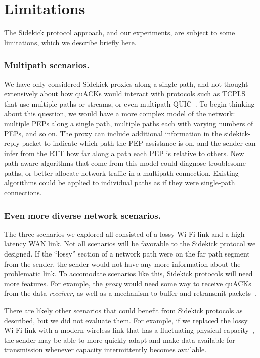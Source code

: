 \section{Limitations}
\label{sec:sidekick:limitations}

The Sidekick protocol approach, and our experiments, are subject to some
limitations, which we describe briefly here.

\subsubsection{Multipath scenarios.}
We have only considered Sidekick proxies along a single path, and not thought
extensively about how quACKs would interact with protocols such as
\mbox{TCPLS}~\cite{rochet2020tcpls} that use multiple paths or streams,
or even multipath QUIC~\cite{de2017multipath}.
To begin thinking about this question, we would have a more complex model of the
network: multiple PEPs along a single path, multiple paths each with varying
numbers of PEPs, and so on. The proxy can include additional information in the
sidekick-reply packet to indicate which path the PEP assistance is on, and the
sender can infer from the RTT how far along a path each PEP is relative to
others. New path-aware algorithms that come from this model could diagnose
troublesome paths, or better allocate network traffic in a multipath
connection. Existing algorithms could be applied to individual paths as if they
were single-path connections.

\subsubsection{Even more diverse network scenarios.}
The three scenarios we explored all consisted of a lossy Wi-Fi link and a
high-latency WAN link. Not all scenarios will be favorable to the
Sidekick protocol we designed.
If the ``lossy'' section of a network path were on the far path segment from the
sender, the sender would not have any more information about the problematic
link. To accomodate scenarios like this, Sidekick protocols will need
more features. For example, the \emph{proxy} would need some way to receive
quACKs from the data \emph{receiver}, as well as a mechanism to buffer and
retransmit packets~\cite{balakrishnan1995snoop,caini2006pepsal}.

There are likely other scenarios that could benefit from Sidekick protocols as
described, but we did not evaluate them. For example, if we replaced the lossy
Wi-Fi link with a modern wireless link that has a fluctuating physical
capacity~\cite{niu2015survey,burchardt2014vlc,koenig2013wireless}, the sender
may be able to more quickly adapt and make data available for transmission
whenever capacity intermittently becomes available.

